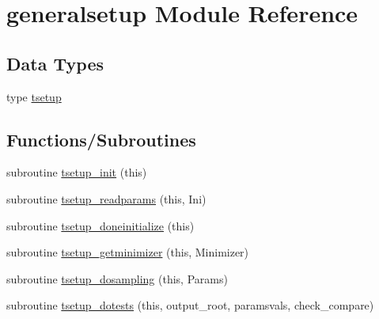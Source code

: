 \hypertarget{namespacegeneralsetup}{}\section{generalsetup Module Reference}
\label{namespacegeneralsetup}
\subsection*{Data Types}
\begin{DoxyCompactItemize}
\item 
type \mbox{\hyperlink{structgeneralsetup_1_1tsetup}{tsetup}}
\end{DoxyCompactItemize}
\subsection*{Functions/\+Subroutines}
\begin{DoxyCompactItemize}
\item 
subroutine \mbox{\hyperlink{namespacegeneralsetup_af2242426644f3fa7db9c7ca3726aeaca}{tsetup\+\_\+init}} (this)
\item 
subroutine \mbox{\hyperlink{namespacegeneralsetup_a2153d54792461f99885b6bdc078cbfe8}{tsetup\+\_\+readparams}} (this, Ini)
\item 
subroutine \mbox{\hyperlink{namespacegeneralsetup_acfe3cccd27f6794ef55ded35c5a7e63b}{tsetup\+\_\+doneinitialize}} (this)
\item 
subroutine \mbox{\hyperlink{namespacegeneralsetup_ab96236dacfcf61193bfa8604d0f82fc0}{tsetup\+\_\+getminimizer}} (this, Minimizer)
\item 
subroutine \mbox{\hyperlink{namespacegeneralsetup_aa31d5951f5285c856d2291afcb518b01}{tsetup\+\_\+dosampling}} (this, Params)
\item 
subroutine \mbox{\hyperlink{namespacegeneralsetup_a8fafc07faa08ebbfd2ba87e7737ac72f}{tsetup\+\_\+dotests}} (this, output\+\_\+root, paramsvals, check\+\_\+compare)
\end{DoxyCompactItemize}
